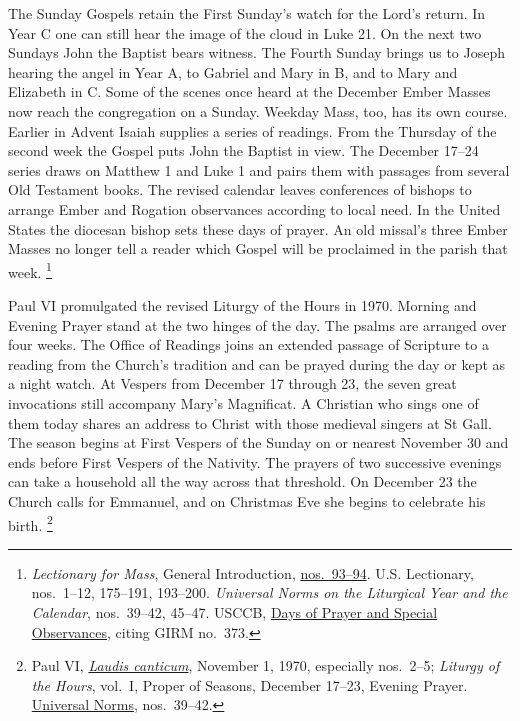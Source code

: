 The Sunday Gospels retain the First Sunday's watch for the Lord's return.
In Year C one can still hear the image of the cloud in Luke 21. On the next
two Sundays John the Baptist bears witness. The Fourth Sunday brings us to
Joseph hearing the angel in Year A, to Gabriel and Mary in B, and to Mary
and Elizabeth in C. Some of the scenes once heard at the December Ember
Masses now reach the congregation on a Sunday. Weekday Mass, too, has its
own course. Earlier in Advent Isaiah supplies a series of readings. From the
Thursday of the second week the Gospel puts John the Baptist in view. The
December 17--24 series draws on Matthew 1 and Luke 1 and pairs them with
passages from several Old Testament books. The revised calendar leaves
conferences of bishops to arrange Ember and Rogation observances according
to local need. In the United States the diocesan bishop sets these days of
prayer. An old missal's three Ember Masses no longer tell a reader
which Gospel will be proclaimed in the parish that week.
\footnote{\emph{Lectionary for Mass}, General Introduction,
\href{https://www.liturgyoffice.org.uk/Resources/GIRM/Documents/Lectionary.pdf}{nos.~93--94}.
U.S. Lectionary, nos.~1--12, 175--191, 193--200. \emph{Universal Norms on the
Liturgical Year and the Calendar}, nos.~39--42, 45--47. USCCB,
\href{https://www.usccb.org/committees/divine-worship/special-observances}{Days of Prayer and Special Observances}, citing GIRM no.~373.}

Paul VI promulgated the revised Liturgy of the Hours in 1970. Morning and
Evening Prayer stand at the two hinges of the day. The psalms are arranged
over four weeks. The Office of Readings joins an extended passage of Scripture
to a reading from the Church's tradition and can be prayed during the day
or kept as a night watch. At Vespers from December 17 through 23, the seven
great invocations still accompany Mary's Magnificat. A Christian who sings
one of them today shares an address to Christ with those medieval singers at
St Gall. The season begins at First Vespers of the Sunday on or nearest
November 30 and ends before First Vespers of the Nativity. The prayers of
two successive evenings can take a household all the way across that
threshold. On December 23 the Church calls for Emmanuel, and on Christmas
Eve she begins to celebrate his birth.
\footnote{Paul VI, \href{https://www.vatican.va/content/paul-vi/la/apost_constitutions/documents/hf_p-vi_apc_19701101_laudis-canticum.html}{\emph{Laudis canticum}},
November 1, 1970, especially nos.~2--5; \emph{Liturgy of the Hours},
vol.~I, Proper of Seasons, December 17--23, Evening Prayer.
\href{https://www.usccb.org/prayer-worship/liturgical-year/advent}{Universal Norms},
nos.~39--42.}
